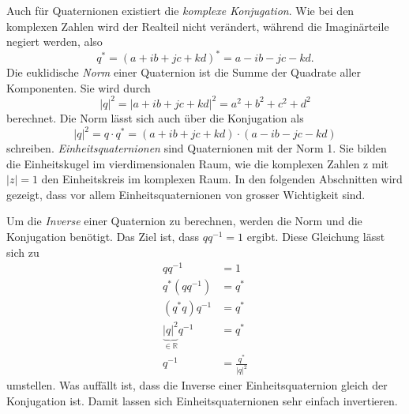 Auch für Quaternionen existiert die \emph{komplexe Konjugation}. Wie bei 
%
den komplexen Zahlen wird der Realteil nicht verändert, während die
Imaginärteile negiert werden, also
\begin{equation*}
    q^* = (a + ib + jc + kd)^* = a - ib - jc - kd .
\end{equation*}
Die euklidische \emph{Norm} einer Quaternion ist die Summe der Quadrate aller 
Komponenten. Sie wird durch
\begin{equation*}
    |q|^2 = |a + ib + jc + kd|^2 = a^2 + b^2 + c^2 + d^2
\end{equation*}
berechnet.
Die Norm lässt sich auch über die Konjugation als
%
\begin{equation*}
    |q|^2 = q \cdot q^* 
    = (a + ib + jc + kd) \cdot (a - ib - jc - kd)
\end{equation*}
schreiben.
\emph{Einheitsquaternionen} sind Quaternionen mit der Norm 1. Sie 
%
bilden die Einheitskugel im vierdimensionalen Raum, wie die komplexen 
Zahlen z mit $|z| = 1$ den 
%
Einheitskreis im komplexen Raum. In den folgenden Abschnitten wird 
gezeigt, dass vor allem Einheitsquaternionen von grosser 
Wichtigkeit sind.

Um die \emph{Inverse} einer Quaternion zu berechnen, werden die Norm und 
die Konjugation benötigt. Das Ziel ist, dass $q q^{-1} = 1$ 
%
ergibt. Diese Gleichung lässt sich zu
\begin{align*}
    q q^{-1} &= 1 \\
    q^* (qq^{-1}) &= q^* \\
    (q^* q) q^{-1} &= q^* \\
    \underbrace{|q|^2}_{\in \mathbb{R}} q^{-1} &= q^* \\
    q^{-1} &= \frac{q^*}{|q|^2}
\end{align*}
umstellen.
Was auffällt ist, dass die Inverse einer Einheitsquaternion gleich 
der Konjugation ist. Damit lassen sich Einheitsquaternionen sehr 
einfach invertieren.
